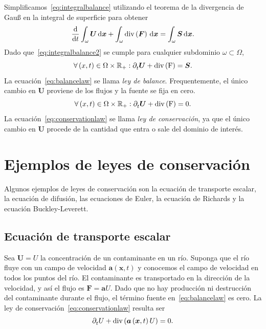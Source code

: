 Simplificamos~\eqref{eq:integralbalance} utilizando el teorema de la
divergencia de Gauß en la integral de superficie para obtener
\begin{equation}\label{eq:integralbalance2}
    \diff{}{t}
    \int_{\omega}
    \bm{U}\dl{\bm{x}}
    +\int_{\omega}
    \operatorname{div}
    \left(\bm{F}\right)\dl{\bm{x}}=
    \int_{\omega}
    \bm{S}\dl{\bm{x}}.
\end{equation}
Dado que~\eqref{eq:integralbalance2} se cumple para cualquier
subdominio $\omega\subset\Omega$,
\begin{equation}\label{eq:balancelaw}
    \forall\left(x,t\right)\in\Omega\times\mathbb{R}_{+}:
    \difcp{\bm{U}}{t}+
    \operatorname{\operatorname{div}
        \left(\bm{F}\right)}=
    \bm{S}.
\end{equation}
La ecuación~\eqref{eq:balancelaw} se llama \emph{ley de balance}.
Frequentemente, el único cambio en $\bm{U}$ proviene de los
flujos y la fuente se fija en cero.
\begin{equation}\label{eq:conservationlaw}
    \forall\left(x,t\right)\in
    \Omega\times\mathbb{R}_{+}:
    \difcp{\bm{U}}{t}+
    \operatorname{\operatorname{div}
        \left(\bm{F}\right)}=
    0.
\end{equation}
La ecuación~\eqref{eq:conservationlaw} se llama
\emph{ley de conservación}, ya que el único cambio en $\bm{U}$
procede de la cantidad que entra o sale del dominio de interés.

\section*{Ejemplos de leyes de conservación}

Algunos ejemplos de leyes de conservación son la ecuación de
transporte escalar, la ecuación de difusión, las ecuaciones de Euler,
la ecuación de Richards y la ecuación Buckley-Leverett.

\subsection*{Ecuación de transporte escalar}

Sea $\bm{U}=U$ la concentración de un contaminante en un río.
Suponga que el río fluye con un campo de velocidad
$\bm{a}\left(\bm{x},t\right)$ y conocemos el campo de
velocidad en todos los puntos del río.
El contaminante es transportado en la dirección de la velocidad, y
así el flujo es $\bm{F}=\bm{a}U$.
Dado que no hay producción ni destrucción del contaminante durante el
flujo, el término fuente en~\eqref{eq:balancelaw} es cero.
La ley de conservación~\eqref{eq:conservationlaw} resulta ser
\begin{equation}
    \difcp{U}{t}+
    \operatorname{div}
    \left(\bm{a}\left(\bm{x},t\right)U\right)=
    0.
\end{equation}

